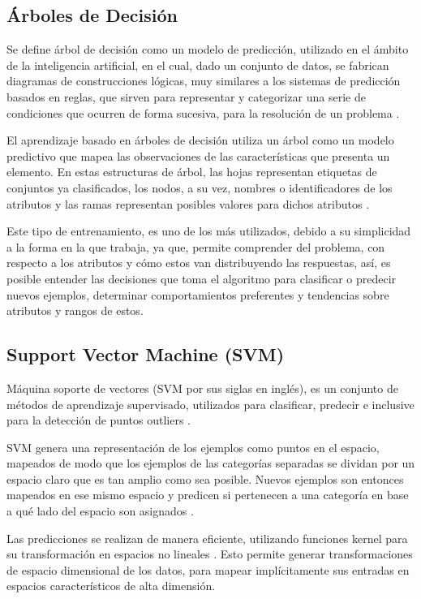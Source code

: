 \subsection{Árboles de Decisión}

Se define árbol de  decisión como un modelo de predicción, utilizado en el ámbito de la inteligencia artificial, en el cual,  dado un conjunto de datos, se fabrican diagramas de construcciones lógicas, muy similares a los sistemas de predicción basados en reglas, que sirven para representar y categorizar una serie de condiciones que ocurren de forma sucesiva, para la resolución de un problema \cite{freund1999alternating}.  

El aprendizaje basado en árboles de decisión utiliza un árbol como un modelo predictivo que mapea las observaciones de las características que presenta un elemento. En estas estructuras de árbol, las hojas representan etiquetas de conjuntos ya clasificados, los nodos, a su vez, nombres o identificadores de los atributos y las ramas representan posibles valores para dichos atributos \cite{bhargava2013decision}.


Este tipo de entrenamiento, es uno de los más utilizados, debido a su simplicidad a la forma en la que trabaja, ya que, permite comprender del problema, con respecto a los atributos y cómo estos van distribuyendo las respuestas, así, es posible entender las decisiones que toma el algoritmo para clasificar o predecir nuevos ejemplos, determinar comportamientos preferentes y tendencias sobre atributos y rangos de estos.

\subsection{Support Vector Machine (SVM)}

Máquina soporte de vectores (SVM por sus siglas en inglés), es un conjunto de métodos de aprendizaje supervisado, utilizados para clasificar, predecir e inclusive para la detección de puntos outliers  \cite{scholkopf2001learning}. 

SVM genera una representación de los ejemplos como puntos en el espacio, mapeados de modo que los ejemplos de las categorías separadas se dividan por un espacio claro que es tan amplio como sea posible. Nuevos ejemplos son entonces mapeados en ese mismo espacio y predicen si pertenecen a una categoría en base a qué lado del espacio son asignados \cite{scholkopf2001learning}.

Las predicciones se realizan de manera eficiente, utilizando funciones kernel para su transformación en espacios no lineales \cite{amari1999improving}. Esto permite generar transformaciones de espacio dimensional de los datos, para mapear implícitamente sus entradas en espacios característicos de alta dimensión. 

